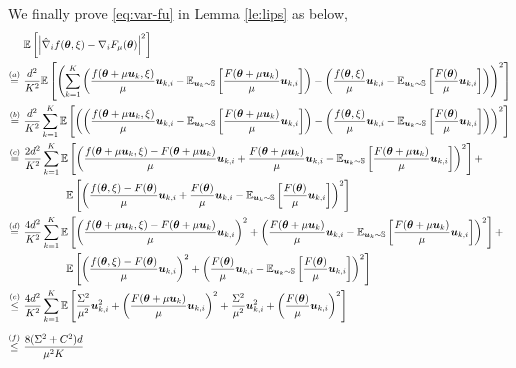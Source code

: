 \begin{appendices}
We finally prove \eqref{eq:var-fu} in Lemma \ref{le:lips} as below,
\begin{equation}
\begin{aligned}
&\E\left[\left|\hat{\nabla}_i f(\vtheta, \xi) - \nabla_i F_{\mu}(\vtheta)\right|^2\right] \\
\stackrel{(a)}{=}\ & \frac{d^2}{K^2}\E\left[\left(\sum_{k=1}^K \left(\frac{f(\vtheta + \mu\vu_k, \xi)}{\mu}\vu_{k,i} - \E_{\vu_k \sim \sS}\left[\frac{F(\vtheta + \mu \vu_k)}{\mu} \vu_{k,i}\right]\right) - \left(\frac{f(\vtheta, \xi)}{\mu}\vu_{k,i} -  \E_{\vu_k \sim \sS}\left[\frac{F(\vtheta)}{\mu}\vu_{k,i}\right]\right)\right)^2\right] \\
\stackrel{(b)}{=}\ & \frac{d^2}{K^2}\sum_{k=1}^K\E\left[\left(\left(\frac{f(\vtheta + \mu\vu_k, \xi)}{\mu}\vu_{k,i} - \E_{\vu_k \sim \sS}\left[\frac{F(\vtheta + \mu \vu_k)}{\mu} \vu_{k,i}\right]\right) - \left(\frac{f(\vtheta, \xi)}{\mu}\vu_{k,i} -  \E_{\vu_k \sim \sS}\left[\frac{F(\vtheta)}{\mu}\vu_{k,i}\right]\right)\right)^2\right] \\
\stackrel{(c)}{=}\ & \frac{2d^2}{K^2}\sum_{k=1}^K\E\left[\left(\frac{f(\vtheta + \mu\vu_k, \xi) - F(\vtheta + \mu\vu_k)}{\mu}\vu_{k,i} + \frac{F(\vtheta + \mu\vu_k)}{\mu}\vu_{k,i}- \E_{\vu_k \sim \sS}\left[\frac{F(\vtheta + \mu \vu_k)}{\mu} \vu_{k,i}\right]\right)^2\right] + \\
&\qquad \qquad \E\left[\left(\frac{f(\vtheta, \xi) - F(\vtheta)}{\mu}\vu_{k,i} + \frac{F(\vtheta)}{\mu}\vu_{k,i}-  \E_{\vu_k \sim \sS}\left[\frac{F(\vtheta)}{\mu}\vu_{k,i}\right]\right)^2\right] \\
\stackrel{(d)}{=}\ & \frac{4d^2}{K^2}\sum_{k=1}^K\E\left[\left(\frac{f(\vtheta + \mu\vu_k, \xi) - F(\vtheta + \mu\vu_k)}{\mu}\vu_{k,i}\right)^2 + \left(\frac{F(\vtheta + \mu\vu_k)}{\mu}\vu_{k,i}- \E_{\vu_k \sim \sS}\left[\frac{F(\vtheta + \mu \vu_k)}{\mu} \vu_{k,i}\right]\right)^2\right] + \\
&\qquad \qquad \E\left[\left(\frac{f(\vtheta, \xi) - F(\vtheta)}{\mu}\vu_{k,i}\right)^2 + \left(\frac{F(\vtheta)}{\mu}\vu_{k,i}-  \E_{\vu_k \sim \sS}\left[\frac{F(\vtheta)}{\mu}\vu_{k,i}\right]\right)^2\right] \\
\stackrel{(e)}{\leq}\ & \frac{4d^2}{K^2}\sum_{k=1}^K\E\left[\frac{\Sigma^2}{\mu^2}\vu_{k,i}^2 + \left(\frac{F(\vtheta + \mu\vu_k)}{\mu}\vu_{k,i}\right)^2 + \frac{\Sigma^2}{\mu^2}\vu_{k,i}^2 + \left(\frac{F(\vtheta)}{\mu}\vu_{k,i}\right)^2\right] \\[6pt]
\stackrel{(f)}{\leq}\ &\frac{8(\Sigma^2 + C^2)d }{\mu^2 K}
\end{aligned}

\end{equation}
\end{appendices}

